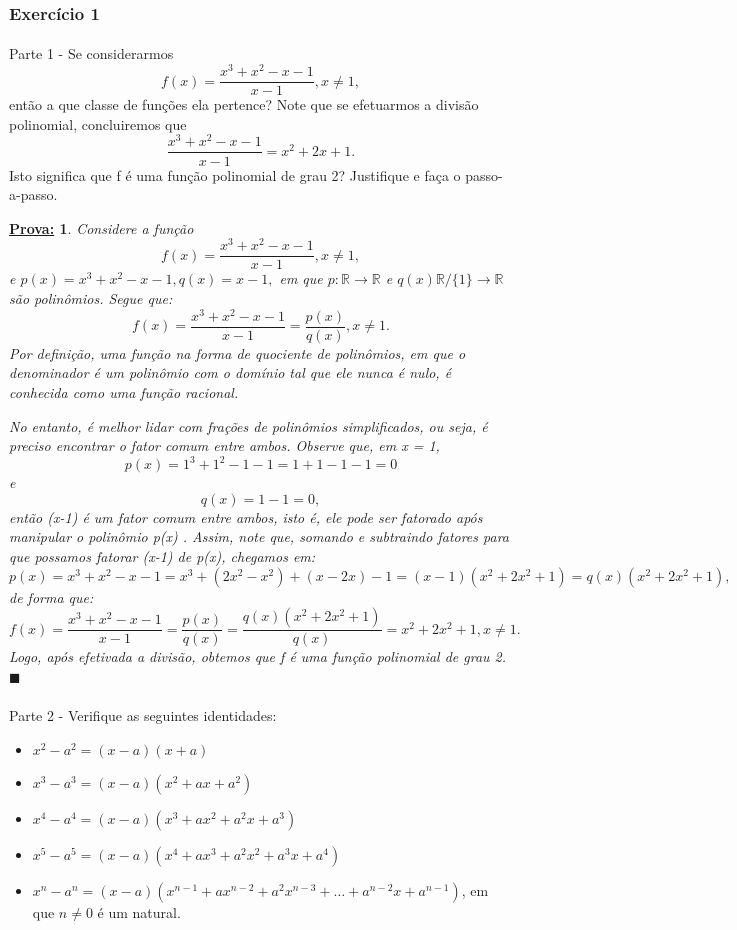 \documentclass{article}
\newtheorem*{proof*}{\underline{Prova:}}
\renewcommand\qedsymbol{$\blacksquare$}
\begin{document}
\subsubsection{Exerc\'icio 1}
\paragraph{}Parte 1 - Se considerarmos
$$
	f(x) = \frac{x^3 + x^2 - x - 1}{x-1}, x\neq{1},
$$
ent\~ao a que classe de fun\c c\~oes ela pertence? Note que se efetuarmos a divis\~ao polinomial, concluiremos que
$$
	\frac{x^3 + x^2 - x - 1}{x-1} = x^2 + 2x + 1.
$$
Isto significa que f \'e uma fun\c c\~ao polinomial de grau 2? Justifique e fa\c ca o passo-a-passo.
\begin{proof*}
	Considere a fun\c c\~ao
	$$
		f(x) = \frac{x^3 + x^2 - x - 1}{x-1}, x\neq{1},
	$$
	e $p(x) = x^3 + x^2 - x - 1, q(x) = x - 1,$ em que $p:\mathbb{R}\rightarrow\mathbb{R}$ e $q(x)\mathbb{R}/\{1\}\rightarrow\mathbb{R}$ s\~ao polin\^omios. Segue que:
	$$
		f(x) = \frac{x^3 + x^2 - x - 1}{x-1} = \frac{p(x)}{q(x)}, x\neq{1}.
	$$
	Por defini\c c\~ao, uma fun\c c\~ao na forma de quociente de polin\^omios, em que o denominador \'e um polin\^omio com o dom\'inio tal que ele nunca \'e nulo, \'e conhecida como uma fun\c c\~ao racional.

	No entanto, \'e melhor lidar com fra\c c\~oes de polin\^omios simplificados, ou seja, \'e preciso encontrar o fator comum entre ambos. Observe que, em x = 1,
	$$
		p(x) = 1^3 + 1^2 - 1 - 1 = 1 + 1 - 1 - 1 = 0
	$$
	e
	$$
		q(x) = 1 - 1 = 0,
	$$
	ent\~ao (x-1) \'e um fator comum entre ambos, isto \'e, ele pode ser fatorado ap\'os manipular o polin\^omio p(x) . Assim, note que, somando e subtraindo fatores para que possamos fatorar (x-1) de p(x), chegamos em:
	$$
		p(x) = x^3 + x^2 - x - 1 = x^3 + (2x^2 - x^2) +(x - 2x) -1 = (x-1)(x^2 + 2x^2 + 1) = q(x)(x^2 + 2x^2 + 1),
	$$
	de forma que:
	$$
		f(x) = \frac{x^3 + x^2 - x - 1}{x-1} = \frac{p(x)}{q(x)} = \frac{q(x)(x^2 + 2x^2 + 1)}{q(x)} = x^2 + 2x^2 + 1, x\neq{1}.
	$$
	Logo, ap\'os efetivada a divis\~ao, obtemos que f \'e uma fun\c c\~ao polinomial de grau 2.
	\qedsymbol
\end{proof*}

\newpage

\paragraph{}Parte 2 - Verifique as seguintes identidades:
\begin{itemize}
	\item[a)] \(x^{2} - a^{2} = (x-a)(x+a)\)
	\item[b)] \(x^{3} - a^{3} = (x-a)(x^{2}+ax+a^{2})\)
	\item[c)] \(x^{4} - a^{4} = (x-a)(x^{3}+ax^{2}+a^{2}x+a^{3})\)
	\item[d)] \(x^{5} - a^{5} = (x-a)(x^{4} + ax^{3} + a^{2}x^{2} + a^{3}x + a^{4})\)
	\item[e)] \(x^{n}-a^{n} = (x-a)(x^{n-1} + ax^{n-2} + a^{2}x^{n-3} + \dotsc + a^{n-2}x + a^{n-1})\), em que \(n\neq0\) é um natural.
\end{itemize}
\end{document}
